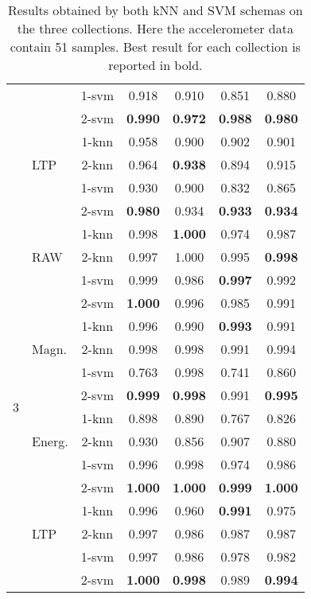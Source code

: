 \documentclass[twocolumn]{svjour3}          \smartqed  \usepackage[draft]{hyperref}
\begin{document}
\begin{table}[tb]
\begin{tabular}{llccccc}
&&1-svm&	0.918&	0.910&	0.851&	0.880\\ 
&&2-svm&	\bf{0.990}&	\bf{0.972}&	\bf{0.988}&	\bf{0.980}\\ 
[2pt] 
&\multirow{3}{*}{LTP}	&1-knn&	0.958&	0.900&	0.902&	0.901\\ 
&&2-knn&	0.964&	\bf{0.938}&	0.894&	0.915\\ 
&&1-svm&	0.930&	0.900&	0.832&	0.865\\ 
&&2-svm&	\bf{0.980}&	0.934&	\bf{0.933}&	\bf{0.934}\\ 
[2pt] 
\hline 
\multirow{16}{*}{3}	&\multirow{3}{*}{RAW}	&1-knn&	0.998&	\bf{1.000}&	0.974&	0.987\\ 
&&2-knn&	0.997&	1.000&	0.995&	\bf{0.998}\\ 
&&1-svm&	0.999&	0.986&	\bf{0.997}&	0.992\\ 
&&2-svm&	\bf{1.000}&	0.996&	0.985&	0.991\\ 
[2pt] 
&\multirow{3}{*}{Magn.}	&1-knn&	0.996&	0.990&	\bf{0.993}&	0.991\\ 
&&2-knn&	0.998&	0.998&	0.991&	0.994\\ 
&&1-svm&	0.763&	0.998&	0.741&	0.860\\ 
&&2-svm&	\bf{0.999}&	\bf{0.998}&	0.991&	\bf{0.995}\\ 
[2pt] 
&\multirow{3}{*}{Energ.}	&1-knn&	0.898&	0.890&	0.767&	0.826\\ 
&&2-knn&	0.930&	0.856&	0.907&	0.880\\ 
&&1-svm&	0.996&	0.998&	0.974&	0.986\\ 
&&2-svm&	\bf{1.000}&	\bf{1.000}&	\bf{0.999}&	\bf{1.000}\\ 
[2pt] 
&\multirow{3}{*}{LTP}	&1-knn&	0.996&	0.960&	\bf{0.991}&	0.975\\ 
&&2-knn&	0.997&	0.986&	0.987&	0.987\\ 
&&1-svm&	0.997&	0.986&	0.978&	0.982\\ 
&&2-svm&	\bf{1.000}&	\bf{0.998}&	0.989&	\bf{0.994}\\ 
[2pt] 
\hline 
\end{tabular}
\medskip
\caption{Results obtained by both kNN and SVM schemas on the three collections. Here the accelerometer data contain 51 samples. Best result for each collection is reported in bold.}
\label{table:results2}
 \end{table}
\end{document}
